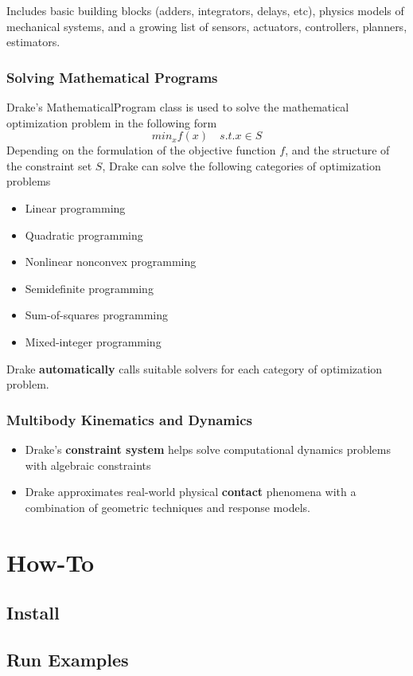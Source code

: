 Includes basic building blocks (adders, integrators, delays, etc), physics models of mechanical systems, and a growing list of sensors, actuators, controllers, planners, estimators.
\subsubsection{Solving Mathematical Programs}
Drake's MathematicalProgram class is used to solve the mathematical optimization problem in the following form
$$min_{x} f(x) \quad s.t. x \in S$$
Depending on the formulation of the objective function $f$, and the structure of the constraint set $S$, Drake can solve the following categories of optimization problems
\begin{itemize}
\item Linear programming
\item Quadratic programming 
\item Nonlinear nonconvex programming
\item Semidefinite programming
\item Sum-of-squares programming
\item Mixed-integer programming
\end{itemize}
Drake \textbf{automatically} calls suitable solvers for each category of optimization problem.
\subsubsection{Multibody Kinematics and Dynamics}
\begin{itemize}
\item Drake's \textbf{constraint system} helps solve computational dynamics problems with algebraic constraints
\item Drake approximates real-world physical \textbf{contact} phenomena with a combination of geometric techniques and response models.
\end{itemize}

\section{How-To}
\subsection{Install}
\subsection{Run Examples}


